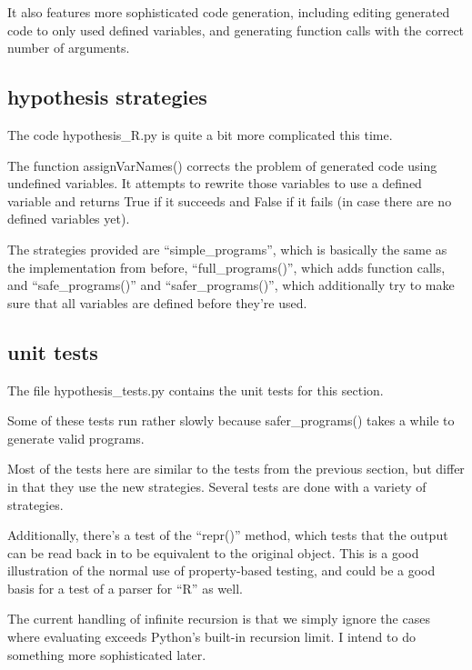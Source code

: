 \documentclass[11pt, oneside]{article}   	%
\begin{document}
It also features more sophisticated code generation, including editing generated code to only used defined variables, and generating function calls with the correct number of arguments.

\subsection{hypothesis strategies}
The code hypothesis\_R.py is quite a bit more complicated this time.

The function assignVarNames() corrects the problem of generated code using undefined variables. It attempts to rewrite those variables to use a defined variable and returns True if it succeeds and False if it fails (in case there are no defined variables yet).

The strategies provided are ``simple\_programs'', which is basically the same as the implementation from before, ``full\_programs()'', which adds function calls, and ``safe\_programs()'' and ``safer\_programs()'', which additionally try to make sure that all variables are defined before they're used.

\subsection{unit tests}
The file hypothesis\_tests.py contains the unit tests for this section.

Some of these tests run rather slowly because safer\_programs() takes a while to generate valid programs.

Most of the tests here are similar to the tests from the previous section, but differ in that they use the new strategies. Several tests are done with a variety of strategies.

Additionally, there's a test of the ``repr()'' method, which tests that the output can be read back in to be equivalent to the original object. This is a good illustration of the normal use of property-based testing, and could be a good basis for a test of a parser for ``R'' as well.

The current handling of infinite recursion is that we simply ignore the cases where evaluating exceeds Python's built-in recursion limit. I intend to do something more sophisticated later.
\end{document}
